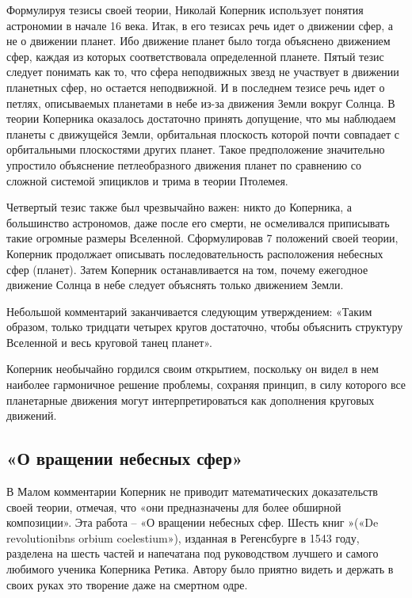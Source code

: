 \documentclass[
]{article}
\begin{document}
Формулируя тезисы своей теории, Николай Коперник использует понятия
астрономии в начале 16 века. Итак, в его тезисах речь идет о движении
сфер, а не о движении планет. Ибо движение планет было тогда объяснено
движением сфер, каждая из которых соответствовала определенной планете.
Пятый тезис следует понимать как то, что сфера неподвижных звезд не
участвует в движении планетных сфер, но остается неподвижной. И в
последнем тезисе речь идет о петлях, описываемых планетами в небе из-за
движения Земли вокруг Солнца. В теории Коперника оказалось достаточно
принять допущение, что мы наблюдаем планеты с движущейся Земли,
орбитальная плоскость которой почти совпадает с орбитальными плоскостями
других планет. Такое предположение значительно упростило объяснение
петлеобразного движения планет по сравнению со сложной системой
эпициклов и трима в теории Птолемея.

Четвертый тезис также был чрезвычайно важен: никто до Коперника, а
большинство астрономов, даже после его смерти, не осмеливался
приписывать такие огромные размеры Вселенной. Сформулировав 7 положений
своей теории, Коперник продолжает описывать последовательность
расположения небесных сфер (планет). Затем Коперник останавливается на
том, почему ежегодное движение Солнца в небе следует объяснять только
движением Земли.

Небольшой комментарий заканчивается следующим утверждением: «Таким
образом, только тридцати четырех кругов достаточно, чтобы объяснить
структуру Вселенной и весь круговой танец планет».

Коперник необычайно гордился своим открытием, поскольку он видел в нем
наиболее гармоничное решение проблемы, сохраняя принцип, в силу которого
все планетарные движения могут интерпретироваться как дополнения
круговых движений.

\hypertarget{ux43e-ux432ux440ux430ux449ux435ux43dux438ux438-ux43dux435ux431ux435ux441ux43dux44bux445-ux441ux444ux435ux440}{%
\subsection{«О вращении небесных
сфер»}\label{ux43e-ux432ux440ux430ux449ux435ux43dux438ux438-ux43dux435ux431ux435ux441ux43dux44bux445-ux441ux444ux435ux440}}

В Малом комментарии Коперник не приводит математических доказательств
своей теории, отмечая, что «они предназначены для более обширной
композиции». Эта работа -- «О вращении небесных сфер. Шесть книг »(«De
revolutionibns orbium coelestium»), изданная в Регенсбурге в 1543 году,
разделена на шесть частей и напечатана под руководством лучшего и самого
любимого ученика Коперника Ретика. Автору было приятно видеть и держать
в своих руках это творение даже на смертном одре.
\end{document}
